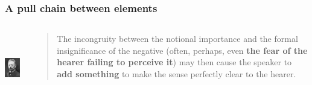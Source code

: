 \documentclass[compress]{beamer}
\begin{document}
\begin{frame}
	\begin{center}
	\end{center}
\end{frame}


\begin{frame}
\frametitle{A pull chain between elements}
\begin{columns}[T]  
   \begin{column}{.2\textwidth}
  	  \vspace{12pt}
	  \includegraphics[height=1.2in]{jespersen.jpg}   
   \end{column}
   \begin{column}{.8\textwidth}
      \begin{block}{}
      \begin{quote}
The incongruity between the notional importance and the formal insignificance of the negative (often, perhaps, even \textbf{the fear of the hearer failing to perceive it}) may then cause the speaker to \textbf{add something} to make the sense perfectly clear to the hearer.
      \end{quote}
	\end{block}
    \end{column}
  \end{columns}
 \vfill\hfill \citep{jespersen:1917}
\end{frame}
\end{document}
